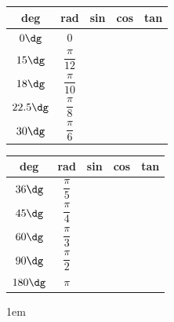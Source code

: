 \documentclass[10pt,paper=letter]{scrartcl}
\begin{document}
\begin{center}
  \begin{minipage}{.45\textwidth}
    \begin{center}
      \def\arraystretch{3}
      \setlength{\tabcolsep}{12pt}
      \begin{tabular}{c|c|c|c|c}
        deg & rad & sin & cos & tan \\ \hline
        $0\dg$ & $0$ &  &  &  \\ \hline
        $15\dg$ & $\dfrac\pi{12}$ &  &  &  \\ \hline
        $18\dg$ & $\dfrac\pi{10}$ &  &  &  \\ \hline
        $22.5\dg$ & $\dfrac\pi8$ &  &  &  \\ \hline
        $30\dg$ & $\dfrac\pi6$ &  &  &
      \end{tabular}
    \end{center}
  \end{minipage}
  \begin{minipage}{.45\textwidth}
    \begin{center}
      \def\arraystretch{3}
      \setlength{\tabcolsep}{12pt}
      \begin{tabular}{c|c|c|c|c}
        deg & rad & sin & cos & tan \\ \hline
        $36\dg$ & $\dfrac\pi5$ &  &  &  \\ \hline
        $45\dg$ & $\dfrac\pi4$ &  &  &  \\ \hline
        $60\dg$ & $\dfrac\pi3$ &  &  &  \\ \hline
        $90\dg$ & $\dfrac\pi2$ &  &  &  \\ \hline
        $180\dg$ & $\pi$ &  &  &
      \end{tabular}
    \end{center}
  \end{minipage}
\end{center}
\vspace{1em}
\openup 1em
\end{document}
